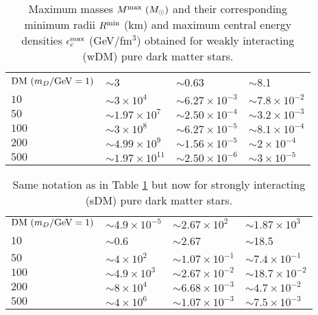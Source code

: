 \documentclass[universe,article,accept,moreauthors,pdftex]{Definitions/mdpi}
\begin{document}
%
\begin{table}[H]
\small
  \caption{Maximum masses $M^{\rm max}~(M_{\odot})$ and their corresponding minimum radii $R^{\rm min}$ (km) and maximum central energy densities $\epsilon^{\rm max}_{c}$ (GeV/fm$^{3}$) obtained for weakly interacting (wDM) pure dark matter stars.}
\label{tab:table1}
  
\begin{tabularx}{\textwidth}{CCCC}
      \toprule
        &  &  & \\
      \midrule
 ${\rm DM}~(m_{D}/{\rm GeV}=1)$ & $\sim$3 & $\sim$0.63 & $\sim$8.1 \\
 $10$ 	& $\sim$$3\times{10^{4}}$ & $\sim$$6.27\times{10^{-3}}$ & $\sim$$7.8\times{10^{-2}}$\\
 $50$ 	& $\sim$$1.97\times{10^{7}}$ & $\sim$$2.50\times{10^{-4}}$ & $\sim$$3.2\times{10^{-3}}$\\
 $100$ 	& $\sim$$3\times{10^{8}}$ & $\sim$$6.27\times{10^{-5}}$ & $\sim$$8.1\times{10^{-4}}$\\
 $200$ 	& $\sim$$4.99\times{10^{9}}$ & $\sim$$1.56\times{10^{-5}}$ & $\sim$$2\times{10^{-4}}$\\
 $500$  & $\sim$$1.97\times{10^{11}}$ & $\sim$$2.50\times{10^{-6}}$ & $\sim$$3\times{10^{-5}}$\\\bottomrule
        \end{tabularx}


\end{table}
  
%
\begin{table}[H]
\small
\caption{Same notation as in Table \ref{tab:table1} but now for strongly interacting (sDM) pure dark matter stars.}
\label{tab:table2}

\begin{tabularx}{\textwidth}{CCCC}
    \toprule
        &  &  & \\
      \midrule
 ${\rm DM}~(m_{D}/{\rm GeV}=1)$ & $\sim$$4.9\times{10^{-5}}$ & $\sim$$2.67\times{10^{2}}$ & $\sim$$1.87\times{10^{3}}$\\
 $10$ 	& $\sim$0.6 & $\sim$2.67 & $\sim$18.5\\
 $50$ 	& $\sim$$4\times{10^{2}}$ & $\sim$$1.07\times{10^{-1}}$ & $\sim 7.4\times{10^{-1}}$\\
 $100$ 	& $ \sim$$4.9\times{10^{3}}$ & $\sim$$2.67\times{10^{-2}}$ & $\sim$$18.7\times{10^{-2}}$\\
 $200$ 	& $\sim$$8\times{10^{4}}$ & $\sim$$6.68\times{10^{-3}}$ & $\sim$$4.7\times{10^{-2}}$\\
 $500$  & $\sim$$4\times 10^{6}$ & $\sim$$1.07\times{10^{-3}}$ & $\sim$$7.5\times{10^{-3}}$\\\bottomrule
        \end{tabularx}

\end{table}
%  
\end{document}
